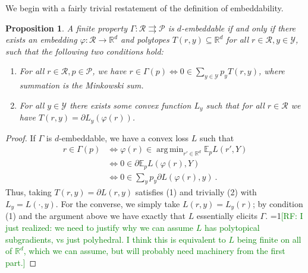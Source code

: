 \documentclass[11pt]{article}
\newcommand{\Comments}{1}
\newcommand{\mynote}[2]{\ifnum\Comments=1\textcolor{#1}{#2}\fi}
\newcommand{\raf}[1]{\mynote{green}{[RF: #1]}}
\newcommand{\reals}{\mathbb{R}}
\newcommand{\E}{\mathbb{E}}
\renewcommand{\P}{\mathcal{P}}
\newcommand{\R}{\mathcal{R}}
\newcommand{\Y}{\mathcal{Y}}
\newcommand{\toto}{\rightrightarrows}
\DeclareMathOperator*{\argmin}{arg\,min}
\newtheorem{proposition}{Proposition}
\begin{document}
We begin with a fairly trivial restatement of the definition of embeddability.
\begin{proposition}
  A finite property $\Gamma:\R\toto\P$ is $d$-embeddable if and only if there exists an embedding $\varphi: \R \to \reals^d$ and polytopes $T(r,y) \subseteq \reals^d$ for all $r\in\R, y\in\Y$, such that the following two conditions hold:
  \begin{enumerate}
  \item For all $r\in\R, p\in\P$, we have $r\in \Gamma(p) \iff 0 \in \sum_{y\in\Y} p_y T(r,y)$, where summation is the Minkowski sum.
  \item For all $y\in\Y$ there exists some convex function $L_y$ such that for all $r\in\R$ we have $T(r,y) = \partial L_y(\varphi(r))$.
  \end{enumerate}
\end{proposition}
\begin{proof}
  If $\Gamma$ is $d$-embeddable, we have a convex loss $L$ such that
  \begin{align*}
    r \in \Gamma(p) &\iff \varphi(r) \in \argmin_{r'\in\reals^d} \E_p L(r',Y)\\
                    &\iff 0 \in \partial \E_p L(\varphi(r),Y) \\
                    &\iff 0 \in \sum_y p_y \partial L(\varphi(r),y)~.
  \end{align*}
  Thus, taking $T(r,y) = \partial L(r,y)$ satisfies (1) and trivially (2) with $L_y = L(\cdot,y)$.
  For the converse, we simply take $L(r,y) = L_y(r)$; by condition (1) and the argument above we have exactly that $L$ essentially elicits $\Gamma$.
  \raf{I just realized: we need to justify why we can assume $L$ has polytopical subgradients, vs just polyhedral.  I think this is equivalent to $L$ being finite on all of $\reals^d$, which we can assume, but will probably need machinery from the first part.}
\end{proof}
\end{document}
